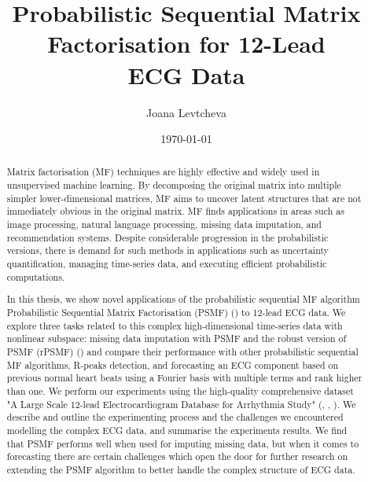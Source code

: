 \documentclass{mldsmsc}
\title{Probabilistic Sequential Matrix Factorisation for 12-Lead \\ ECG Data}
\author{Joana Levtcheva}
\date{\today}
\begin{document}
\maketitle


\declarationdate{\today}
\declaration 

\begin{abstract}

Matrix factorisation (MF) techniques are highly effective and widely used in unsupervised machine learning. By decomposing the original matrix into multiple simpler lower-dimensional matrices, MF aims to uncover latent structures that are not immediately obvious in the original matrix. MF finds applications in areas such as image processing, natural language processing, missing data imputation, and recommendation systems. Despite considerable progression in the probabilistic versions, there is demand for such methods in applications such as uncertainty quantification, managing time-series data, and executing efficient probabilistic computations. \newline

\noindent In this thesis, we show novel applications of the probabilistic sequential MF algorithm Probabilistic Sequential Matrix Factorisation (PSMF) (\cite{akyildiz2021probabilistic}) to 12-lead ECG data. We explore three tasks related to this complex high-dimensional time-series data with nonlinear subspace: missing data imputation with PSMF and the robust version of PSMF (rPSMF) (\cite{akyildiz2021probabilistic}) and compare their performance with other probabilistic sequential MF algorithms, R-peaks detection, and forecasting an ECG component based on previous normal heart beats using a Fourier basis with multiple terms and rank higher than one. We perform our experiments using the high-quality comprehensive dataset "A Large Scale 12-lead Electrocardiogram Database for Arrhythmia Study" (\cite{cite1}, \cite{cite2}, \cite{cite3}). We describe and outline the experimenting process and the challenges we encountered modelling the complex ECG data, and summarise the experiments results. We find that PSMF performs well when used for imputing missing data, but when it comes to forecasting there are certain challenges which open the door for further research on extending the PSMF algorithm to better handle the complex structure of ECG data. \newline

\end{abstract}
\end{document}

